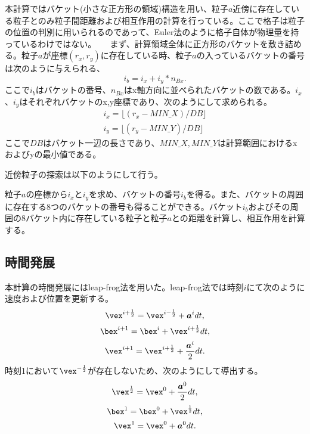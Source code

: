 \documentclass[]{jsarticle}
\begin{document}
本計算ではバケット(小さな正方形の領域)構造を用い、粒子$a$近傍に存在している粒子とのみ粒子間距離および相互作用の計算を行っている\cite{Koshiduka2014}。ここで格子は粒子の位置の判別に用いられるのであって、Euler法のように格子自体が物理量を持っているわけではない。
　
まず、計算領域全体に正方形のバケットを敷き詰める。粒子$a$が座標$(r_x, r_y)$に存在している時、粒子$a$の入っているバケットの番号は次のように与えられる、
\begin{equation}
i_b=i_x+i_y*n_{Bx}.
\end{equation}
ここで$i_b$はバケットの番号、$n_{Bx}$はx軸方向に並べられたバケットの数である。$i_x$、$i_y$はそれぞれバケットのx,y座標であり、次のようにして求められる。
\begin{equation}
\label{eqn:backet}
  \begin{split}
  {i_x=\lfloor(r_x-MIN\_X)/DB \rfloor}\\
  {i_y=\lfloor(r_y-MIN\_Y)/DB \rfloor}
\end{split}
\end{equation}
ここで$DB$はバケット一辺の長さであり、$MIN\_X,MIN\_Y$は計算範囲におけるxおよびyの最小値である。

近傍粒子の探索は以下のようにして行う。

粒子$a$の座標から$i_x$と$i_y$を求め、バケットの番号$i_b$を得る。また、バケットの周囲に存在する8つのバケットの番号も得ることができる。バケット$i_b$およびその周囲の8バケット内に存在している粒子と粒子$a$との距離を計算し、相互作用を計算する。


\subsection{時間発展}
本計算の時間発展にはleap-frog法を用いた。leap-frog法では時刻$i$にて次のように速度および位置を更新する。
\begin{equation}
  \vex^{i+\frac{1}{2}}=\vex^{i-\frac{1}{2}}+\bm{a}^idt,
\end{equation}
\begin{equation}
  \bex^{i+1}=\bex^i+\vex^{i+\frac{1}{2}}dt,
\end{equation}
\begin{equation}
  \vex^{i+1}=\vex^{i+\frac{1}{2}}+\frac{\bm{a}^i}{2}dt.
\end{equation}
時刻1において$\vex^{-\frac{1}{2}}$が存在しないため、次のようにして導出する。
\begin{equation}
  \vex^{\frac{1}{2}}=\vex^{0}+\frac{\bm{a}^0}{2}dt,
\end{equation}
\begin{equation}
  \bex^{1}=\bex^0+\vex^{\frac{1}{2}}dt,
\end{equation}
\begin{equation}
  \vex^{1}=\vex^{0}+\bm{a}^0dt.
\end{equation}
\end{document}
